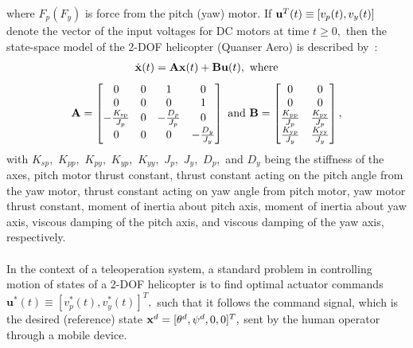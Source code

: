 where $F_p(F_y)$ is force from the pitch (yaw) motor. If ${\bf u}^T(t)  \equiv [v_p(t),v_y(t)]$ denote the vector of the input voltages for DC motors at time $t\ge 0,$ then the state-space model of the 2-DOF helicopter (Quanser Aero) is described by~\cite{FaBiMi2018-c1}:
%
\begin{align}
  \dot{\bf x}(t) = {\bf A}{\bf x}(t) +{\bf B}{\bf u}(t),~\mathrm{where}
\label{eq:stateModel}
\end{align}  
%
\begin{align*}
{\bf A} =  
\begin{bmatrix}
0 & 0 & 1 & 0\\
0 & 0 & 0 & 1\\
-\frac{K_{\text{sp}}}{J_p} & 0 & -\frac{D_p}{J_p} &  0\\
0 & 0 & 0 & -\frac{D_y}{J_y}    
\end{bmatrix}
~\text{and}~
  {\bf B} =
\begin{bmatrix}
0 & 0\\
0 & 0\\
\frac{K_{\text{pp}}}{J_p} & \frac{K_{\text{py}}}{J_p}\\
\frac{K_{\text{yp}}}{J_y} & \frac{K_{\text{yy}}}{J_y}                           
\end{bmatrix},
\end{align*}
%
with $K_{sp},$ $K_{pp},$ $K_{py},$ $K_{yp},$ $K_{yy},$ $J_p,$ $J_y,$ $D_p,$ and $D_y$ being the stiffness of the axes, pitch motor thrust constant, thrust constant acting on the pitch angle from the yaw motor, thrust constant acting on yaw angle from pitch motor, yaw motor thrust constant, moment of inertia about pitch axis, moment of inertia about yaw axis, viscous damping of the pitch axis, and viscous damping of the yaw axis, respectively.\\ 
\\
In the context of a teleoperation system, a standard problem in controlling motion of states of a 2-DOF helicopter is to find optimal actuator commands $\mathbf{u}^*(t)\equiv[v_p^*(t),v_y^*(t)]^T,$ such that it follows the command signal, which is the desired (reference) state ${\bf x}^{d} = [\theta^{d},\psi^{d},0,0]^T,$ sent by the human operator through a mobile device. 






